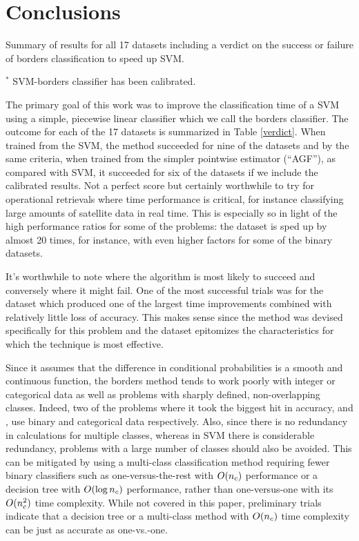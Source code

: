 \section{Conclusions}

\label{conclusion}

\begin{table}
	\caption{Summary of results for all 17 datasets including a verdict on the success or failure of borders classification to speed up SVM.}
	\label{verdict}
	
	\vspace{1 ex}

	\raggedright $^*$ SVM-borders classifier has been calibrated.
\end{table}

The primary goal of this work was to improve the classification time of a SVM
using a simple, piecewise linear classifier which we call the borders classifier.
The outcome for each of the 17 datasets is summarized in Table \ref{verdict}.
When trained from the SVM, the method succeeded for nine of the datasets and
by the same criteria, when trained from the simpler pointwise estimator (``AGF''),
as compared with SVM, it succeeded for six of the datasets
if we include the calibrated  results.
Not a perfect score but certainly worthwhile to try for operational retrievals
where time performance is critical, for instance classifying large amounts of satellite
data in real time.
This is especially so in light of the high performance ratios for some of the problems:
the  dataset is sped up by almost 20 times,
for instance, with even higher factors for some of the binary datasets.

It's worthwhile to note where the algorithm is most likely to succeed and conversely
where it might fail.
One of the most successful trials was for the  dataset which produced one of
the largest time improvements combined with relatively little loss of accuracy.
This makes sense since the method was devised specifically for this problem and
the  dataset epitomizes the characteristics for which the technique is most
effective.

Since it assumes that the difference in conditional probabilities is a
smooth and continuous function, the borders method 
tends to work poorly with integer or categorical data as well as problems
with sharply defined, non-overlapping classes.
Indeed, two of the problems where it took the biggest hit in accuracy,  and , 
use binary and categorical data respectively.
Also, since there is no redundancy in calculations for multiple classes, 
whereas in SVM there is considerable redundancy, problems with a large number of
classes should also be avoided.
This can be mitigated by using a multi-class classification method
requiring fewer binary classifiers such as one-versus-the-rest with $O(n_c)$
performance or a decision tree with $O(\log n_c)$ performance, rather than
one-versus-one with its $O(n_c^2)$ time complexity.
While not covered in this paper, preliminary trials indicate that
a decision tree or a multi-class method with $O(n_c)$ time complexity
can be just as accurate as one-vs.-one.

